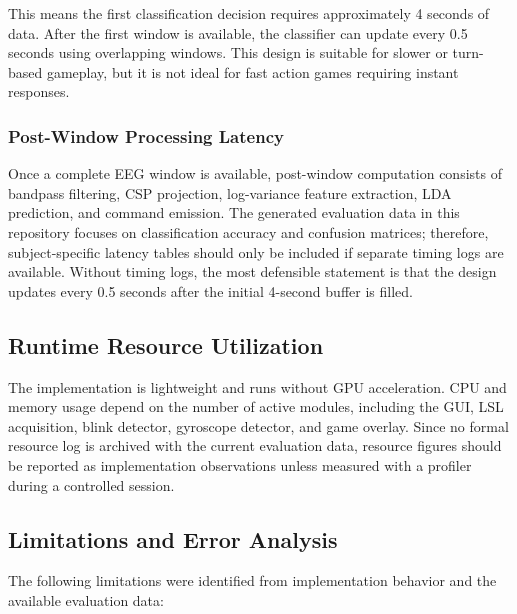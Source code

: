 This means the first classification decision requires approximately 4 seconds of data. After the first window is available, the classifier can update every 0.5 seconds using overlapping windows. This design is suitable for slower or turn-based gameplay, but it is not ideal for fast action games requiring instant responses.

\subsubsection{Post-Window Processing Latency}

Once a complete EEG window is available, post-window computation consists of bandpass filtering, CSP projection, log-variance feature extraction, LDA prediction, and command emission. The generated evaluation data in this repository focuses on classification accuracy and confusion matrices; therefore, subject-specific latency tables should only be included if separate timing logs are available. Without timing logs, the most defensible statement is that the design updates every 0.5 seconds after the initial 4-second buffer is filled.

\subsection{Runtime Resource Utilization}

The implementation is lightweight and runs without GPU acceleration. CPU and memory usage depend on the number of active modules, including the GUI, LSL acquisition, blink detector, gyroscope detector, and game overlay. Since no formal resource log is archived with the current evaluation data, resource figures should be reported as implementation observations unless measured with a profiler during a controlled session.

\subsection{Limitations and Error Analysis}

The following limitations were identified from implementation behavior and the available evaluation data:

